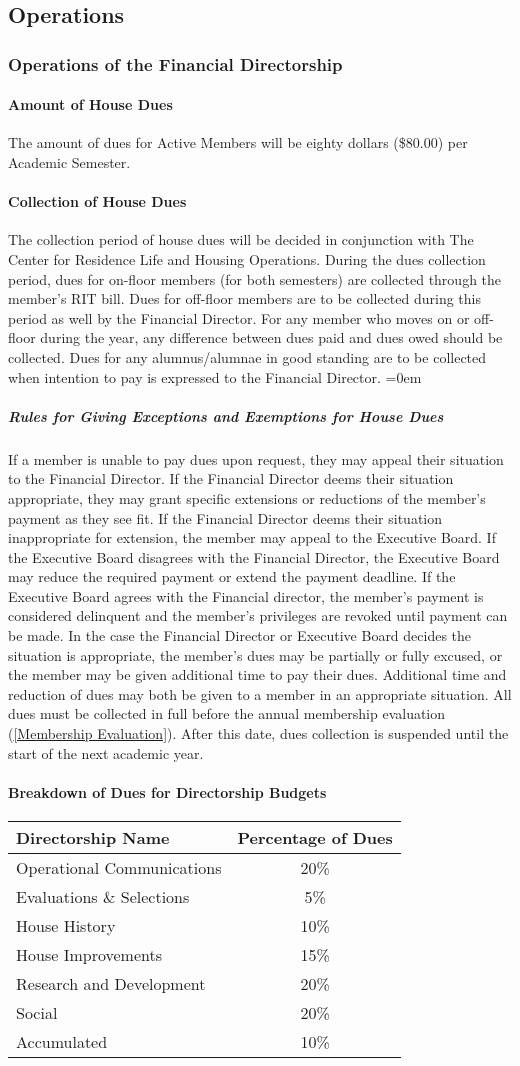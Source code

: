\documentclass{article}
\newcommand{\asection}[1]{\subsection{#1} \label{#1}}
\newcommand{\asubsection}[1]{\subsubsection{#1} \label{#1}}
\newcommand{\asubsubsection}[1]{\paragraph{#1} \label{#1}}
\newcommand{\asubsubsubsection}[1]{\parindent=0em\subparagraph{#1} \label{#1}}
\begin{document}
\asection{Operations}
\asubsection{Operations of the Financial Directorship}
\asubsubsection{Amount of House Dues}
The amount of dues for Active Members will be eighty dollars (\$80.00) per Academic Semester.
\asubsubsection{Collection of House Dues}
The collection period of house dues will be decided in conjunction with The Center for Residence Life and Housing Operations.
During the dues collection period, dues for on-floor members (for both semesters) are collected through the member’s RIT bill.
Dues for off-floor members are to be collected during this period as well by the Financial Director.
For any member who moves on or off-floor during the year, any difference between dues paid and dues owed should be collected.
Dues for any alumnus/alumnae in good standing are to be collected when intention to pay is expressed to the Financial Director.
\asubsubsubsection{Rules for Giving Exceptions and Exemptions for House Dues}
If a member is unable to pay dues upon request, they may appeal their situation to the Financial Director.
If the Financial Director deems their situation appropriate, they may grant specific extensions or reductions of the member's payment as they see fit.
If the Financial Director deems their situation inappropriate for extension, the member may appeal to the Executive Board.
If the Executive Board disagrees with the Financial Director, the Executive Board may reduce the required payment or extend the payment deadline.
If the Executive Board agrees with the Financial director, the member’s payment is considered delinquent and the member’s privileges are revoked until payment can be made.
In the case the Financial Director or Executive Board decides the situation is appropriate, the member's dues may be partially or fully excused, or the member may be given additional time to pay their dues. 
Additional time and reduction of dues may both be given to a member in an appropriate situation.
All dues must be collected in full before the annual membership evaluation (\ref{Membership Evaluation}).
After this date, dues collection is suspended until the start of the next academic year.
\asubsubsection{Breakdown of Dues for Directorship Budgets}
\begin{center}
\begin{tabular}[c]{|l c|}
\hline
Directorship Name & Percentage of Dues \\
\hline
\hline
Operational Communications & 20\% \\
\hline
Evaluations \& Selections & 5\% \\
\hline
House History & 10\% \\
\hline
House Improvements & 15\% \\
\hline
Research and Development & 20\% \\
\hline
Social & 20\% \\
\hline
Accumulated & 10\% \\
\hline
\end{tabular}
\end{center}
\end{document}

